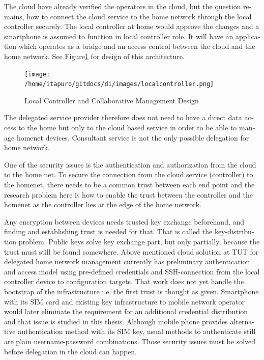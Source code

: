 \documentclass[12pt,a4paper,english]{tutthesis}
\begin{document}
\begin{otherlanguage}{english}
The cloud have already verified the operators in the cloud, but the
question remains, how to connect the cloud service to the home network
through the local controller securely. The local controller at home
would approve the changes and a smartphone is assumed to function in
local controller role. It will have an application which operates as a
bridge and an access control between the cloud and the home network.
See Figure\ref{fig:localcontroller} for design of this architecture.

\begin{figure}[htb]
\centering
\texttt{[image: /home/itapuro/gitdocs/di/images/localcontroller.png]}
\caption{\label{fig:localcontroller}Local Controller and Collaborative Management Design}
\end{figure}


The delegated service provider therefore does not need to have a direct data
access to the home but only to the cloud based service in order to be able to
manage homenet devices.
Consultant service is not the only possible delegation for home network.








One of the security issues is the authentication and authorization 
from the cloud to the home net.
To secure the connection from the cloud service (controller)
to the homenet, there needs to be a common trust between each end
point and the research problem here is how to enable the trust between the
controller and the homenet as the controller lies at the edge of the
home network.


Any encryption between devices needs trusted key exchange beforehand,
and finding and establishing trust is needed for that.  That is called
the key-distribution problem. Public keys solve key exchange part, but
only partially, because the trust must still be found somewhere.
Above mentioned cloud solution at TUT for delegated home network
management currently has preliminary authentication and access model
using pre-defined credentials and SSH-connection from the local
controller device to configuration
targets\cite[Chap.4]{silverajan2015collaborative}.
That work does not yet handle the bootstrap of the infrastructure
i.e. the first trust is thought as given.  Smartphone with its SIM
card and existing key infrastructure to mobile network operator would
later eliminate the requirement for an additional credential
distribution and that issue is studied in this thesis.
Although mobile phone provides alternative
authentication method with its SIM key, usual methods to
authenticate still are plain username-password combinations.
Those security issues must be solved before delegation in the cloud can
happen.  





\end{otherlanguage}
\end{document}
